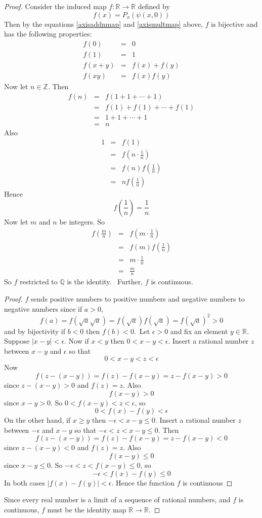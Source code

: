 \documentclass[honours]{UNSWthesis}
\newcommand{\R}{\mathbb{R}}
\newcommand{\Z}{\mathbb{Z}}
\newcommand{\Q}{\mathbb{Q}}
\newcommand{\1}{\mathbf{e}_{1}}
\newcommand{\2}{\mathbf{e}_{3}}
\newcommand{\3}{\mathbf{e}_{3}}
\begin{document}
\begin{proof}
Consider the induced map $f:\R \longrightarrow \R$ defined by
\[
f(x)=P_{x}(\psi(x,0))
\]
Then by the equations \ref{axisaddnmap} and \ref{axismultmap} above, $f$ is bijective and has the following properties:
\begin{eqnarray*}
f(0) &=& 0 \\
f(1) &=& 1 \\
f(x+y)&=& f(x)+f(y) \\
f(xy) &=& f(x)f(y)
\end{eqnarray*} 
Now let $n \in \Z$. Then 
\begin{eqnarray*}
f(n) &=& f(1+1+ \cdots +1) \\
&=&f(1)+f(1) + \cdots +f(1) \\
&=& 1+1+ \cdots +1 \\
&=& n
\end{eqnarray*}
Also 
\begin{eqnarray*}
1 &=&f(1) \\
 &=& f\left( n \cdot \frac{1}{n} \right) \\
&=& f(n)f\left( \frac{1}{n} \right) \\
&=& nf\left( \frac{1}{n} \right)
\end{eqnarray*}
Hence 
\[
f \left( \frac{1}{n} \right)=\frac{1}{n}
\]
Now let $m$ and $n$ be integers. So 
\begin{eqnarray*}
f \left(\frac{m}{n}\right)&=&f\left(m \cdot \frac{1}{n}\right)\\
&=& f(m)f\left(\frac{1}{n}\right) \\
&=& m\cdot \frac{1}{n} \\
&=& \frac{m}{n}
\end{eqnarray*}
So $f$ restricted to $\Q$ is the identity. \
Further, $f$ is continuous.
\begin{proof}
$f$ sends positive numbers to positive numbers and negative numbers to negative numbers since if $a>0$,
\[
f(a)=f(\sqrt{a}\sqrt{a})=f(\sqrt{a})f(\sqrt{a})=f(\sqrt{a})^{2}>0
\]
and by bijectivity if $b<0$ then $f(b)<0$.\
Let $\epsilon >0$ and fix an element $y \in \R$. Suppose $|x-y|<\epsilon$. Now if $x<y$ then $0<x-y<\epsilon$. Insert a rational number $z$ between $x-y$ and $\epsilon$ so that
\[
0<x-y<z<\epsilon
\]
Now
\[
f(z-(x-y))=f(z)-f(x-y)=z-f(x-y)>0
\]
since $z-(x-y)>0$ and $f(z)=z$. Also
\[
f(x-y)>0
\]
since $x-y>0$. So $0<f(x-y)<z<\epsilon$, so
\[
0<f(x)-f(y)<\epsilon
\]
On the other hand, if $x \geq y $ then $-\epsilon<x-y \leq 0$. Insert a rational number $z$ between $-\epsilon$ and $x-y$ so that $-\epsilon<z<x-y \leq 0$. Then 
\[
f(z-(x-y))=f(z)-f(x-y)=z-f(x-y)<0
\]
since $z-(x-y)<0$ and $f(z)=z$. Also
\[
f(x-y)\leq 0
\]
since $x-y \leq 0$. So $-\epsilon<z<f(x-y)\leq 0$, so
\[
-\epsilon < f(x)-f(y) \leq 0
\]
In both cases $|f(x)-f(y)|<\epsilon$. Hence the function $f$ is continuous
\end{proof}
Since every real number is a limit of a sequence of rational numbers, and $f$ is continuous, $f$ must be the identity map $\R \longrightarrow \R$. 


\end{proof}
\end{document}
